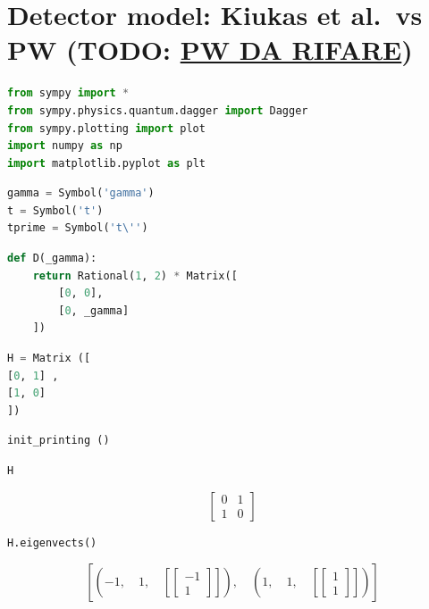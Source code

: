 \hypertarget{detector-model-kiukas-et-al.vs-pw}{%
\section{ Detector model: Kiukas et al.~vs PW (TODO: {\color{red}\underline{PW DA RIFARE}}) }
\label{detector-model-kiukas-et-al.vs-pw}}

\begin{lstlisting}[language=Python]
from sympy import *
from sympy.physics.quantum.dagger import Dagger
from sympy.plotting import plot
import numpy as np
import matplotlib.pyplot as plt
\end{lstlisting}

\begin{lstlisting}[language=Python]
gamma = Symbol('gamma')
t = Symbol('t')
tprime = Symbol('t\'')
\end{lstlisting}

\begin{lstlisting}[language=Python]
def D(_gamma):
    return Rational(1, 2) * Matrix([
        [0, 0],
        [0, _gamma]
    ])
\end{lstlisting}

\begin{lstlisting}[language=Python]
H = Matrix ([
[0, 1] ,
[1, 0]
])
\end{lstlisting}

\begin{lstlisting}[language=Python]
init_printing ()
\end{lstlisting}

\begin{lstlisting}[language=Python]
H
\end{lstlisting}

\[\left[\begin{matrix}0 & 1\\1 & 0\end{matrix}\right]\]

\begin{lstlisting}[language=Python]
H.eigenvects()
\end{lstlisting}

\[\left [ \left ( -1, \quad 1, \quad \left [ \left[\begin{matrix}-1\\1\end{matrix}\right]\right ]\right ), \quad \left ( 1, \quad 1, \quad \left [ \left[\begin{matrix}1\\1\end{matrix}\right]\right ]\right )\right ]\]

